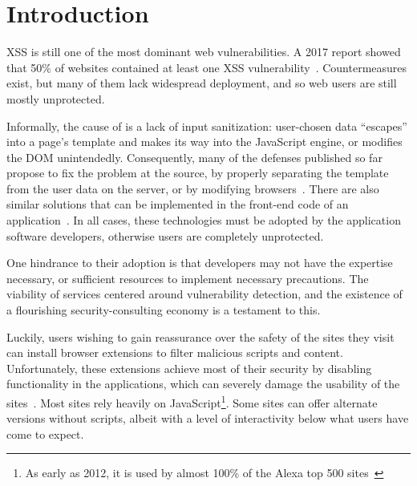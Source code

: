 \section{Introduction} \label{introduction}

\ac{XSS} is still one of the most dominant web vulnerabilities. A 2017
report showed that 50\% of websites contained at least one \ac{XSS}
vulnerability~\cite{Acunetix}. Countermeasures exist, but many of them
lack widespread deployment, and so web users are still mostly
unprotected.

Informally, the cause of \xss is a lack of input sanitization:
user-chosen data ``escapes'' into a page's template and makes its way
into the JavaScript engine, or modifies the DOM
unintendedly.
%
Consequently, many of the \xss defenses published so far
propose to fix the problem at the source, by properly separating the
template from the user data on the server, or by modifying
browsers~\cite{Jim:2007:DSI:1242572.1242654,Nadji:2009,Wurzinger:2009:SMX:1656360.1656379,Sundareswaran:2012:XHS:2352970.2352994}.
%
There are also similar solutions that can be implemented in the
front-end code of an application~\cite{10.1007/978-3-319-66399-9_7}.
In all cases, these technologies must be adopted by the application
software developers, otherwise users are completely unprotected.

One hindrance to their adoption is that developers may not have the
expertise necessary, or sufficient resources to implement necessary
precautions.
The viability of services centered around vulnerability detection,
and the existence of a flourishing security-consulting economy
is a testament to this.


Luckily, users wishing to gain reassurance over the safety of the
sites they visit can install browser extensions to filter malicious
scripts and content. Unfortunately, these extensions achieve most of
their security by disabling functionality in the applications, which
can severely damage the usability of the
sites~\cite{Noscript,Snyder:2017:MWD:3133956.3133966}. Most sites rely
heavily on JavaScript\footnote{As early as 2012, it is used by almost
  100\% of the Alexa top 500
  sites~\cite{Stock:2017:WTI:3241189.3241265}}. Some sites can offer
alternate versions without scripts, albeit with a level of interactivity below
what users have come to expect.

